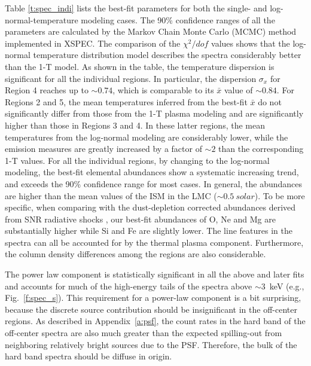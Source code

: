 \documentclass[usenatbib]{mnras}
\begin{document}
Table \ref{t:spec_indi} lists the best-fit parameters for both the single- and log-normal-temperature modeling cases. 
The 90\% confidence ranges of all the parameters are calculated by the Markov Chain Monte Carlo (MCMC) method implemented in XSPEC. 
The comparison of the $\chi^2/dof$ values shows that the log-normal temperature distribution model describes the spectra considerably better than the 1-T model. 
As shown in the table, the temperature dispersion is significant for all the individual regions. In particular, the dispersion $\sigma_{x}$ for Region 4 reaches up to $\sim 0.74$, which is comparable to its $\bar{x}$ value of $\sim 0.84$. 
For Regions 2 and 5, the mean temperatures inferred from the best-fit $\bar{x}$  do not significantly differ from those from the 1-T plasma modeling and are significantly higher than those in Regions 3 and 4. In these latter regions, the mean temperatures from the log-normal modeling are considerably lower, while the emission measures are greatly increased by a factor of $\sim2$ than the corresponding 1-T values.
For all the individual regions, by changing to the log-normal modeling, the best-fit elemental abundances show a systematic increasing trend, and exceeds the 90\% confidence range for most cases. In general, the abundances are higher than the mean values of the ISM in the LMC ($\sim 0.5~solar$). To be more specific, when comparing with the dust-depletion corrected abundances derived from SNR radiative shocks \citep{dopita19}, our best-fit abundances of O, Ne and Mg are substantially higher while Si and Fe are slightly lower. The line features in the spectra can all be accounted for by the thermal plasma component. Furthermore, the column density differences among the regions are also considerable. 

The power law component is statistically significant in all the above and later fits and accounts for much of the high-energy tails of the spectra above $\sim 3$~keV (e.g., Fig.~\ref{f:spec_s}). This requirement for a power-law component is a bit surprising, because the discrete source contribution should be insignificant in the off-center regions. As described in Appendix~\ref{a:psf}, 
the count rates in the hard band of the off-center spectra are also much greater than the expected spilling-out from neighboring relatively bright sources due to the PSF.  Therefore, the bulk of the hard band spectra should be diffuse in origin.
\end{document}
